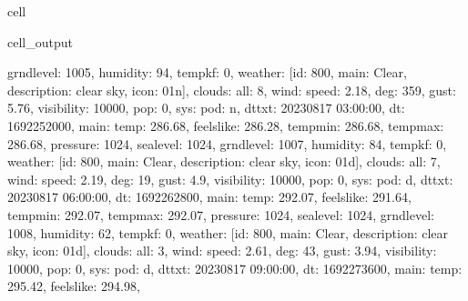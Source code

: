 \documentclass[letterpaper,10pt,english]{jupyterBook}
\begin{document}
\begin{sphinxuseclass}{cell}
\begin{sphinxVerbatimOutput}
\begin{sphinxuseclass}{cell_output}
\begin{sphinxVerbatim}[commandchars=\\\{\}]
\PYGZsq{}grnd\PYGZus{}level\PYGZsq{}: 1005, \PYGZsq{}humidity\PYGZsq{}: 94, \PYGZsq{}temp\PYGZus{}kf\PYGZsq{}: 0\PYGZcb{}, \PYGZsq{}weather\PYGZsq{}: [\PYGZob{}\PYGZsq{}id\PYGZsq{}: 800, \PYGZsq{}main\PYGZsq{}: \PYGZsq{}Clear\PYGZsq{}, \PYGZsq{}description\PYGZsq{}: \PYGZsq{}clear sky\PYGZsq{}, \PYGZsq{}icon\PYGZsq{}: \PYGZsq{}01n\PYGZsq{}\PYGZcb{}], \PYGZsq{}clouds\PYGZsq{}: \PYGZob{}\PYGZsq{}all\PYGZsq{}: 8\PYGZcb{}, \PYGZsq{}wind\PYGZsq{}: \PYGZob{}\PYGZsq{}speed\PYGZsq{}: 2.18, \PYGZsq{}deg\PYGZsq{}: 359, \PYGZsq{}gust\PYGZsq{}: 5.76\PYGZcb{}, \PYGZsq{}visibility\PYGZsq{}: 10000, \PYGZsq{}pop\PYGZsq{}: 0, \PYGZsq{}sys\PYGZsq{}: \PYGZob{}\PYGZsq{}pod\PYGZsq{}: \PYGZsq{}n\PYGZsq{}\PYGZcb{}, \PYGZsq{}dt\PYGZus{}txt\PYGZsq{}: \PYGZsq{}2023\PYGZhy{}08\PYGZhy{}17 03:00:00\PYGZsq{}\PYGZcb{}, \PYGZob{}\PYGZsq{}dt\PYGZsq{}: 1692252000, \PYGZsq{}main\PYGZsq{}: \PYGZob{}\PYGZsq{}temp\PYGZsq{}: 286.68, \PYGZsq{}feels\PYGZus{}like\PYGZsq{}: 286.28, \PYGZsq{}temp\PYGZus{}min\PYGZsq{}: 286.68, \PYGZsq{}temp\PYGZus{}max\PYGZsq{}: 286.68, \PYGZsq{}pressure\PYGZsq{}: 1024, \PYGZsq{}sea\PYGZus{}level\PYGZsq{}: 1024, \PYGZsq{}grnd\PYGZus{}level\PYGZsq{}: 1007, \PYGZsq{}humidity\PYGZsq{}: 84, \PYGZsq{}temp\PYGZus{}kf\PYGZsq{}: 0\PYGZcb{}, \PYGZsq{}weather\PYGZsq{}: [\PYGZob{}\PYGZsq{}id\PYGZsq{}: 800, \PYGZsq{}main\PYGZsq{}: \PYGZsq{}Clear\PYGZsq{}, \PYGZsq{}description\PYGZsq{}: \PYGZsq{}clear sky\PYGZsq{}, \PYGZsq{}icon\PYGZsq{}: \PYGZsq{}01d\PYGZsq{}\PYGZcb{}], \PYGZsq{}clouds\PYGZsq{}: \PYGZob{}\PYGZsq{}all\PYGZsq{}: 7\PYGZcb{}, \PYGZsq{}wind\PYGZsq{}: \PYGZob{}\PYGZsq{}speed\PYGZsq{}: 2.19, \PYGZsq{}deg\PYGZsq{}: 19, \PYGZsq{}gust\PYGZsq{}: 4.9\PYGZcb{}, \PYGZsq{}visibility\PYGZsq{}: 10000, \PYGZsq{}pop\PYGZsq{}: 0, \PYGZsq{}sys\PYGZsq{}: \PYGZob{}\PYGZsq{}pod\PYGZsq{}: \PYGZsq{}d\PYGZsq{}\PYGZcb{}, \PYGZsq{}dt\PYGZus{}txt\PYGZsq{}: \PYGZsq{}2023\PYGZhy{}08\PYGZhy{}17 06:00:00\PYGZsq{}\PYGZcb{}, \PYGZob{}\PYGZsq{}dt\PYGZsq{}: 1692262800, \PYGZsq{}main\PYGZsq{}: \PYGZob{}\PYGZsq{}temp\PYGZsq{}: 292.07, \PYGZsq{}feels\PYGZus{}like\PYGZsq{}: 291.64, \PYGZsq{}temp\PYGZus{}min\PYGZsq{}: 292.07, \PYGZsq{}temp\PYGZus{}max\PYGZsq{}: 292.07, \PYGZsq{}pressure\PYGZsq{}: 1024, \PYGZsq{}sea\PYGZus{}level\PYGZsq{}: 1024, \PYGZsq{}grnd\PYGZus{}level\PYGZsq{}: 1008, \PYGZsq{}humidity\PYGZsq{}: 62, \PYGZsq{}temp\PYGZus{}kf\PYGZsq{}: 0\PYGZcb{}, \PYGZsq{}weather\PYGZsq{}: [\PYGZob{}\PYGZsq{}id\PYGZsq{}: 800, \PYGZsq{}main\PYGZsq{}: \PYGZsq{}Clear\PYGZsq{}, \PYGZsq{}description\PYGZsq{}: \PYGZsq{}clear sky\PYGZsq{}, \PYGZsq{}icon\PYGZsq{}: \PYGZsq{}01d\PYGZsq{}\PYGZcb{}], \PYGZsq{}clouds\PYGZsq{}: \PYGZob{}\PYGZsq{}all\PYGZsq{}: 3\PYGZcb{}, \PYGZsq{}wind\PYGZsq{}: \PYGZob{}\PYGZsq{}speed\PYGZsq{}: 2.61, \PYGZsq{}deg\PYGZsq{}: 43, \PYGZsq{}gust\PYGZsq{}: 3.94\PYGZcb{}, \PYGZsq{}visibility\PYGZsq{}: 10000, \PYGZsq{}pop\PYGZsq{}: 0, \PYGZsq{}sys\PYGZsq{}: \PYGZob{}\PYGZsq{}pod\PYGZsq{}: \PYGZsq{}d\PYGZsq{}\PYGZcb{}, \PYGZsq{}dt\PYGZus{}txt\PYGZsq{}: \PYGZsq{}2023\PYGZhy{}08\PYGZhy{}17 09:00:00\PYGZsq{}\PYGZcb{}, \PYGZob{}\PYGZsq{}dt\PYGZsq{}: 1692273600, \PYGZsq{}main\PYGZsq{}: \PYGZob{}\PYGZsq{}temp\PYGZsq{}: 295.42, \PYGZsq{}feels\PYGZus{}like\PYGZsq{}: 294.98, 
\end{sphinxVerbatim}
\end{sphinxuseclass}
\end{sphinxVerbatimOutput}
\end{sphinxuseclass}
\end{document}
